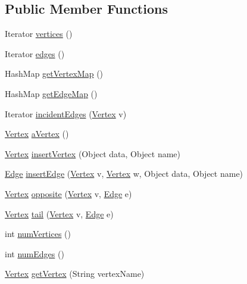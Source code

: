 \subsection*{Public Member Functions}
\begin{DoxyCompactItemize}
\item 
Iterator \hyperlink{classgraphCode_1_1SimpleGraph_a9c8e1eedfc1f1f9b15cbaf0b7d1e60cd}{vertices} ()
\item 
Iterator \hyperlink{classgraphCode_1_1SimpleGraph_a806589f8bd826802e960c2cc3e6d7c06}{edges} ()
\item 
Hash\+Map \hyperlink{classgraphCode_1_1SimpleGraph_a3abf29703b8e059453d3c11da066dd25}{get\+Vertex\+Map} ()
\item 
Hash\+Map \hyperlink{classgraphCode_1_1SimpleGraph_a2f70f56636e2d881b2593760453d4723}{get\+Edge\+Map} ()
\item 
Iterator \hyperlink{classgraphCode_1_1SimpleGraph_a1c8b377618c14bed26e8007e9b23eda5}{incident\+Edges} (\hyperlink{classgraphCode_1_1Vertex}{Vertex} v)
\item 
\hyperlink{classgraphCode_1_1Vertex}{Vertex} \hyperlink{classgraphCode_1_1SimpleGraph_a4348702804a838f36d7515a765ea8389}{a\+Vertex} ()
\item 
\hyperlink{classgraphCode_1_1Vertex}{Vertex} \hyperlink{classgraphCode_1_1SimpleGraph_a5c1202dd0060fd97620c1dfe4184a371}{insert\+Vertex} (Object data, Object name)
\item 
\hyperlink{classgraphCode_1_1Edge}{Edge} \hyperlink{classgraphCode_1_1SimpleGraph_a4507c310762a6091a25e8cd922662d7e}{insert\+Edge} (\hyperlink{classgraphCode_1_1Vertex}{Vertex} v, \hyperlink{classgraphCode_1_1Vertex}{Vertex} w, Object data, Object name)
\item 
\hyperlink{classgraphCode_1_1Vertex}{Vertex} \hyperlink{classgraphCode_1_1SimpleGraph_ad700bce03aa2ab5cb067a9c5feb2f049}{opposite} (\hyperlink{classgraphCode_1_1Vertex}{Vertex} v, \hyperlink{classgraphCode_1_1Edge}{Edge} e)
\item 
\hyperlink{classgraphCode_1_1Vertex}{Vertex} \hyperlink{classgraphCode_1_1SimpleGraph_a2537a9016af6f2509381c124ed3de524}{tail} (\hyperlink{classgraphCode_1_1Vertex}{Vertex} v, \hyperlink{classgraphCode_1_1Edge}{Edge} e)
\item 
int \hyperlink{classgraphCode_1_1SimpleGraph_ac00393b0333d8b19f2581c4773b8451e}{num\+Vertices} ()
\item 
int \hyperlink{classgraphCode_1_1SimpleGraph_a11a7c6c52ebf307077ab6b887c122425}{num\+Edges} ()
\item 
\hyperlink{classgraphCode_1_1Vertex}{Vertex} \hyperlink{classgraphCode_1_1SimpleGraph_aab1ec8273dce11b72f198ce45ce1e866}{get\+Vertex} (String vertex\+Name)
\end{DoxyCompactItemize}
